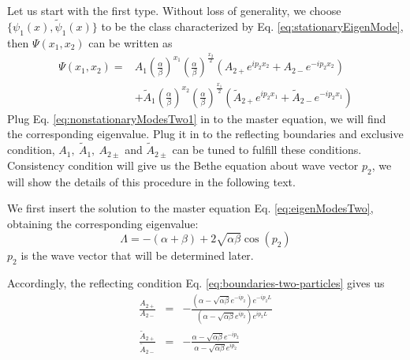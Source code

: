 Let us start with the first type. Without loss of generality, we choose
$\{\psi_1(x), \tilde{\psi}_1(x)\}$ to be the class characterized by Eq.
\eqref{eq:stationaryEigenMode}, then $\Psi(x_1, x_2)$ can be written as
\begin{equation}
    \begin{aligned}
        \label{eq:nonstationaryModesTwo1}
        \Psi(x_1, x_2) = & A_{1}\left(\frac{\alpha}{\beta}\right)^{x_1} 
        \left(\frac{\alpha}{\beta}\right)^{\frac{x_2}{2}} \left( A_{2+} 
            e^{ip_2 x_2} + A_{2-} e^{-ip_2 x_2}\right) \\
        & + \tilde{A}_{1}\left(\frac{\alpha}{\beta}\right)^{x_2} \left(
            \frac{\alpha}{\beta}\right)^{\frac{x_1}{2}} \left( \tilde{A}_{2+}
            e^{ip_2 x_1} + \tilde{A}_{2-} e^{-ip_2 x_1}\right) 
    \end{aligned}
\end{equation}
Plug Eq. \eqref{eq:nonstationaryModesTwo1} in to the master equation, we will
find the corresponding eigenvalue. Plug it in to the reflecting boundaries and
exclusive condition, $A_{1},~\tilde{A}_{1},~A_{2\pm}$ and $\tilde{A}_{2\pm}$ can
be tuned to fulfill these conditions. Consistency condition will give us the
Bethe equation about wave vector $p_2$, we will show the details of this
procedure in the following text.

We first insert the solution to the master equation Eq. \eqref{eq:eigenModesTwo},
obtaining the corresponding eigenvalue:
\begin{equation}
    \label{eq:eigenvaluesTwo1}
    \Lambda = -(\alpha+\beta) + 2\sqrt{\alpha\beta}\cos(p_2)
\end{equation} 
$p_2$ is the wave vector that will be determined later. 

Accordingly, the reflecting condition Eq. \eqref{eq:boundaries-two-particles}
gives us
\begin{subequations}
    \label{eq:scatterFactorBoundary}
    \begin{align}
        \frac{A_{2+}}{A_{2-}} & = & -\frac{\left(\alpha-\sqrt{\alpha\beta}
                e^{-ip_2}\right) e^{-ip_2L}}{\left(\alpha-\sqrt{\alpha\beta} 
                e^{ip_2}\right) e^{ip_2L}}  \\
        \frac{\tilde{A}_{2+}}{\tilde{A}_{2-}} & = & -\frac{\alpha -
            \sqrt{\alpha\beta} e^{-ip_2}}{\alpha-\sqrt{\alpha\beta} e^{ip_2}} 
    \end{align}
\end{subequations}

